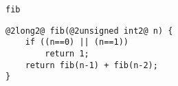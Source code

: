 \begin{frame}[fragile,label=fibC]{\texttt{fib}}
\begin{lstlisting}
@2long2@ fib(@2unsigned int2@ n) {
    if ((n==0) || (n==1))
        return 1;
    return fib(n-1) + fib(n-2);
}
\end{lstlisting}
\end{frame}

